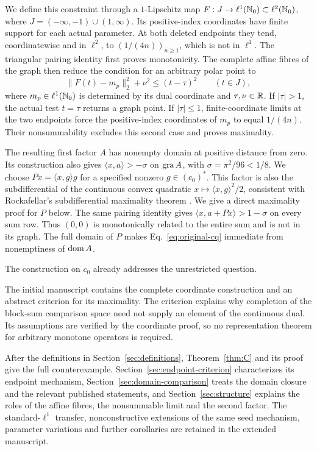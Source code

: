 We define this constraint through a $1$-Lipschitz map
$F:J\to\ell^1(\mathbb N_0)\subset\ell^2(\mathbb N_0)$, where
$J=(-\infty,-1)\cup(1,\infty)$. Its positive-index coordinates have finite
support for each actual parameter. At both deleted endpoints they tend,
coordinatewise and in $\ell^2$, to
$(1/(4n))_{n\ge1}$, which is not in $\ell^1$.
The triangular pairing identity first proves monotonicity. The complete
affine fibres of the graph then reduce the condition for an arbitrary
polar point to
\begin{equation}
\|F(t)-m_p\|_2^2+\nu^2\le(t-\tau)^2
\qquad(t\in J),
\label{eq:polar-intro}
\end{equation}
where $m_p\in\ell^1(\mathbb N_0)$ is determined by its dual coordinate and
$\tau,\nu\in\mathbb R$. If $|\tau|>1$, the actual test $t=\tau$ returns a graph
point. If $|\tau|\le1$, finite-coordinate limits at the two endpoints
force the positive-index coordinates of $m_p$ to equal $1/(4n)$.
Their nonsummability excludes this second case and proves maximality.

The resulting first factor $A$ has nonempty domain at positive distance
from zero. Its construction also gives
$\langle x,a\rangle>-\sigma$ on $\operatorname{gra} A$, with
$\sigma=\pi^2/96<1/8$. We choose
$Px=\langle x,g\rangle g$ for a specified nonzero $g\in(c_0)^*$.
This factor is also the subdifferential of the continuous convex quadratic
$x\mapsto\langle x,g\rangle^2/2$, consistent with Rockafellar's
subdifferential maximality theorem \cite{rockafellar1970subdiff}.
We give a direct maximality proof for $P$ below.
The same pairing identity gives
$\langle x,a+Px\rangle>1-\sigma$ on every sum row.
Thus $(0,0)$ is monotonically related to the entire sum and is not in
its graph. The full domain of $P$ makes
Eq.~\eqref{eq:original-cq} immediate from nonemptiness of $\operatorname{dom} A$.

The construction on $c_0$ already addresses the unrestricted question.

The initial manuscript contains the complete coordinate construction
and an abstract criterion for its maximality. The criterion explains
why completion of the block-sum comparison space need not supply an
element of the continuous dual. Its assumptions are verified by the
coordinate proof, so no representation theorem for arbitrary monotone
operators is required.

After the definitions in Section~\ref{sec:definitions},
Theorem~\ref{thm:C} and its proof give the full counterexample.
Section~\ref{sec:endpoint-criterion} characterizes its endpoint
mechanism, Section~\ref{sec:domain-comparison} treats the domain closure
and the relevant published statements, and Section~\ref{sec:structure}
explains the roles of the affine fibres, the nonsummable limit and the
second factor. The standard-$\ell^1$ transfer, nonconstructive extensions
of the same seed mechanism, parameter variations and further corollaries
are retained in the extended manuscript.


